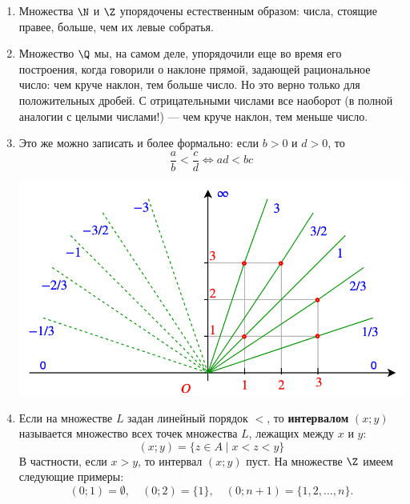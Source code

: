 \begin{enumerate}
\item Множества $\N$ и $\Z$ упорядочены естественным образом: числа, стоящие правее, больше, чем их левые собратья.
\item Множество $\Q$ мы, на самом деле, упорядочили еще во время его построения, когда говорили о наклоне прямой, задающей рациональное число: чем круче наклон, тем больше число. Но это верно только для положительных дробей. С отрицательными числами все наоборот (в полной аналогии с целыми числами!) --- чем круче наклон, тем меньше число.
\item Это же можно записать и более формально: если $b>0$ и $d>0$, то
$$
\frac{a}{b}<\frac{c}{d}\Leftrightarrow ad<bc
$$
\begin{center}
\includegraphics[scale=0.3]{ratio.png}
\end{center}
\item Если на множестве $L$ задан линейный порядок $<$, то \textbf{интервалом} $(x;y)$ называется множество всех точек множества $L$, лежащих между $x$ и $y$:
$$
(x;y) = \{z\in A\mid x<z<y\}
$$
В частности, если $x>y$, то интервал $(x;y)$ пуст. На множестве $\Z$ имеем следующие примеры:
$$
(0;1) = \emptyset,\quad (0;2) = \{1\}, \quad (0;n+1) = \{1,2,\dots, n\}.
$$





\end{enumerate}
